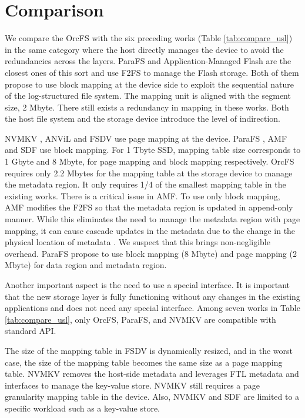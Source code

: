 \documentclass[prodmode,acmtecs]{acmsmall}
\begin{document}
\section{Comparison}
\label{sec:comparison}
We compare the OrcFS with the six preceding works (Table
\ref{tab:compare_usl}) in the same category where the host directly
manages the device to avoid the redundancies across the layers. ParaFS
\cite{zhang2016parafs} and Application-Managed Flash
\cite{lee2016application} are the closest ones of this sort and use
F2FS to manage the Flash storage. Both of them propose to use block
mapping at the device side to exploit the sequential nature of the
log-structured file system.  The mapping unit is aligned with the
segment size, 2 Mbyte.  There still exists a redundancy in mapping in
these works.  Both the host file system and the storage device
introduce the level of indirection.

NVMKV \cite{nvmkv}, ANViL \cite{anvil} and FSDV \cite{zhangremoving}
use page mapping at the device. ParaFS \cite{zhang2016parafs}, AMF
\cite{lee2016application} and SDF \cite{sdf} use block mapping. For 1
Tbyte SSD, mapping table size corresponds to 1 Gbyte and 8 Mbyte, for
page mapping and block mapping respectively. OrcFS requires only
2.2 Mbytes for the mapping table at the storage device to manage the
metadata region. It only requires 1/4 of the smallest
mapping table in the existing works. There is a critical issue in AMF.
To use only block mapping, AMF modifies the F2FS so that the metadata
region is updated in append-only manner. While this eliminates the
need to manage the metadata region with page mapping, it can cause
cascade updates in the metadata due to the change in the physical
location of metadata \cite{rosenblum1992design}. We suspect that this
brings non-negligible overhead. ParaFS propose to use block mapping (8
Mbyte) and page mapping (2 Mbyte) for data region and metadata region.

Another important aspect is the need to use a special interface. It is
important that the new storage layer is fully functioning without any
changes in the existing applications and does not need any special
interface. Among seven works in Table \ref{tab:compare_usl}, only
OrcFS, ParaFS, and NVMKV are compatible with standard API.


The size of the mapping table in FSDV is dynamically resized, and in
the worst case, the size of the mapping table becomes the same size as
a page mapping table.  NVMKV \cite{nvmkv} removes the host-side
metadata and leverages FTL metadata and interfaces to manage the
key-value store.  NVMKV still requires a page granularity mapping table
in the device.  Also, NVMKV \cite{nvmkv} and SDF \cite{sdf} are limited to
a specific workload such as a key-value store.
\end{document}
